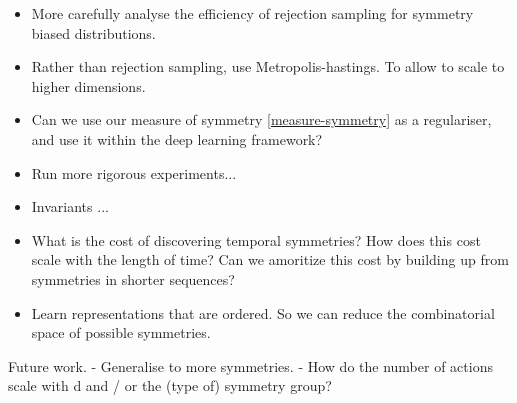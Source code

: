 \begin{itemize}
	\tightlist
	\item More carefully analyse the efficiency of rejection sampling for symmetry biased distributions.
	\item Rather than rejection sampling, use Metropolis-hastings. To allow to scale to higher dimensions.
	\item Can we use our measure of symmetry \ref{measure-symmetry} as a regulariser, and use it within the deep learning framework?
	\item Run more rigorous experiments...
	\item Invariants ...
	\item What is the cost of discovering temporal symmetries? How does this cost scale with the length of time? Can we amoritize this cost by building up from symmetries in shorter
	 sequences?
	\item Learn representations that are ordered. So we can reduce the combinatorial space of possible symmetries.

\end{itemize}


Future work.
- Generalise to more symmetries.
- How do the number of actions scale with d and / or the (type of) symmetry group?


